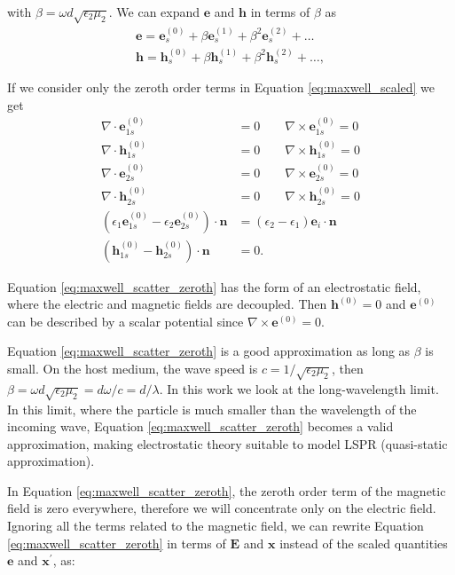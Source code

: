  with $\beta=\omega d \sqrt{\epsilon_2\mu_2}$. We can expand $\mathbf{e}$ and $\mathbf{h}$ in 
 terms of $\beta$ as
 \begin{align} \label{eq:expand}
 \mathbf{e} = \mathbf{e}_s^{(0)} + \beta \mathbf{e}_s^{(1)} + \beta^2 \mathbf{e}_s^{(2)} + \ldots \nonumber\\
 \mathbf{h} = \mathbf{h}_s^{(0)} + \beta \mathbf{h}_s^{(1)} + \beta^2 \mathbf{h}_s^{(2)} + \ldots,
 \end{align}
 
 If we consider only the zeroth order terms in Equation \eqref{eq:maxwell_scaled} we get
 \begin{align} \label{eq:maxwell_scatter_zeroth}
 \nabla \cdot \mathbf{e}^{(0)}_{1s} &= 0 \qquad \nabla \times \mathbf{e}^{(0)}_{1s} = 0 \nonumber \\
 \nabla \cdot \mathbf{h}^{(0)}_{1s} &= 0 \qquad \nabla \times \mathbf{h}^{(0)}_{1s} = 0 \nonumber \\
 \nabla \cdot \mathbf{e}^{(0)}_{2s} &= 0 \qquad \nabla \times \mathbf{e}^{(0)}_{2s} = 0 \nonumber \\
 \nabla \cdot \mathbf{h}^{(0)}_{2s} &= 0 \qquad \nabla \times \mathbf{h}^{(0)}_{2s} = 0 \nonumber \\
 (\epsilon_1\mathbf{e}^{(0)}_{1s} - \epsilon_2\mathbf{e}^{(0)}_{2s})\cdot\mathbf{n} &= (\epsilon_2-\epsilon_1)\mathbf{e}_i\cdot \mathbf{n} \nonumber \\(\mathbf{h}^{(0)}_{1s} - \mathbf{h}^{(0)}_{2s})\cdot \mathbf{n}&=0.
 \end{align}

Equation \eqref{eq:maxwell_scatter_zeroth} has the form of an electrostatic field, where the electric
and magnetic fields are decoupled. Then $\mathbf{h}^{(0)}=0$ and $\mathbf{e}^{(0)}$ can be described by a
scalar potential since $\nabla \times \mathbf{e}^{(0)}=0$.
 
Equation \eqref{eq:maxwell_scatter_zeroth} is a good approximation as long as $\beta$ is small. On the host medium, the wave 
speed is $c=1/\sqrt{\epsilon_2\mu_2}$, then $\beta=\omega d \sqrt{\epsilon_2\mu_2} = d\omega/c  = d/\lambda$. In this work
we look at the long-wavelength limit. In this limit, where the particle is much smaller than the wavelength of 
the incoming wave, Equation \eqref{eq:maxwell_scatter_zeroth} becomes a valid approximation,
making electrostatic theory suitable to model LSPR (quasi-static approximation).

In Equation \eqref{eq:maxwell_scatter_zeroth}, the zeroth order term of the magnetic field is zero
everywhere, therefore we will concentrate only on the electric field. Ignoring all the terms related 
to the magnetic field, we can rewrite Equation \eqref{eq:maxwell_scatter_zeroth} in terms of 
$\mathbf{E}$ and $\mathbf{x}$ instead of the scaled quantities $\mathbf{e}$ and
$\mathbf{x}^\prime$, as:


